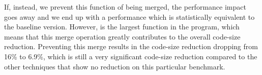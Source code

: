 
If, instead, we prevent this function of being merged, the performance
impact goes away and we end up with a performance which is statistically
equivalent to the baseline version.
However,  is the largest function in the program,
which means that this merge operation greatly contributes
to the overall code-size reduction.
Preventing this merge results in the code-size reduction dropping from 16\% to
6.9\%, which is still a very significant code-size reduction compared to the
other techniques that show no reduction on this particular benchmark.
